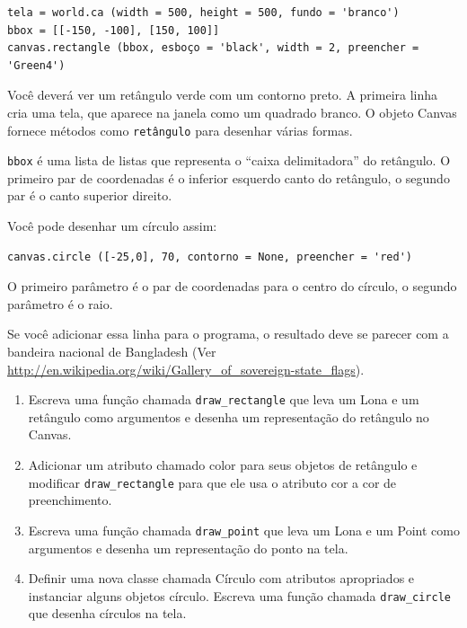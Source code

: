 \documentclass[10pt]{book}
\begin{document}
\begin{exercise}
\begin{v erbatim}
{\begin{}
\begin{verbatim}
tela = world.ca (width = 500, height = 500, fundo = 'branco')
bbox = [[-150, -100], [150, 100]]
canvas.rectangle (bbox, esboço = 'black', width = 2, preencher = 'Green4')
\end{verbatim}

Você deverá ver um retângulo verde com um contorno preto.
A primeira linha cria uma tela, que aparece na janela
como um quadrado branco. O objeto Canvas fornece métodos como
{\tt retângulo} para desenhar várias formas.

{\tt bbox} é uma lista de listas que representa o ``caixa delimitadora''
do retângulo. O primeiro par de coordenadas é o inferior esquerdo
canto do retângulo, o segundo par é o canto superior direito.

Você pode desenhar um círculo assim:

\begin{verbatim}
canvas.circle ([-25,0], 70, contorno = None, preencher = 'red')
\end{verbatim}

O primeiro parâmetro é o par de coordenadas para o centro do
círculo, o segundo parâmetro é o raio.

Se você adicionar essa linha para o programa, 
o resultado deve se parecer com a bandeira nacional de Bangladesh
(Ver \url{http://en.wikipedia.org/wiki/Gallery_of_sovereign-state_flags}).

\begin{enumerate}

\item Escreva uma função chamada \verb "draw_rectangle" que leva um
  Lona e um retângulo como argumentos e desenha um
  representação do retângulo no Canvas.

\item Adicionar um atributo chamado {color \tt} para seus objetos de retângulo e
  modificar \verb "draw_rectangle" para que ele usa o atributo cor
  a cor de preenchimento.

\item Escreva uma função chamada \verb "draw_point" que leva um
  Lona e um Point como argumentos e desenha um
  representação do ponto na tela.

\item Definir uma nova classe chamada Círculo com atributos apropriados e
  instanciar alguns objetos círculo. Escreva uma função chamada
  \Verb "draw_circle" que desenha círculos na tela.


\end{enumerate}
\end{}}
\end{v erbatim}
\end{exercise}
\end{document}
